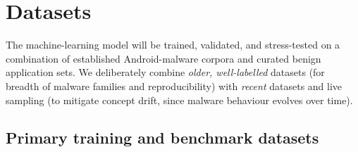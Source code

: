 \documentclass[11pt,a4paper]{article}
\begin{document}
\section{Datasets}
The machine-learning model will be trained, validated, and stress-tested on a
combination of established Android-malware corpora and curated benign application sets.
We deliberately combine \emph{older, well-labelled} datasets (for breadth of malware
families and reproducibility) with \emph{recent} datasets and live sampling (to mitigate
concept drift, since malware behaviour evolves over time).

\subsection{Primary training and benchmark datasets}
\end{document}
